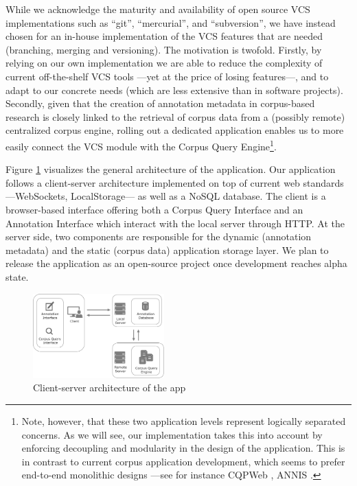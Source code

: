 \documentclass{sig-alternate}
\begin{document}
While we acknowledge the maturity and availability of open source VCS implementations such as
``git'', ``mercurial'', and ``subversion'', we have instead chosen for an in-house implementation
of the VCS features that are needed (branching, merging and versioning). The motivation is twofold.
Firstly, by relying on our own implementation we are able to reduce the complexity of
current off-the-shelf VCS tools ---yet at the price of losing features---,
and to adapt to our concrete needs (which are less extensive than in software projects).
Secondly, given that the creation of annotation metadata in corpus-based research
is closely linked to the retrieval of corpus data from a (possibly remote) centralized corpus engine,
rolling out a dedicated application enables us to more easily connect the VCS module with the Corpus
Query Engine\footnote{
  Note, however, that these two application levels represent logically separated concerns.
  As we will see, our implementation takes this into account by enforcing decoupling and modularity
  in the design of the application. This is in contrast to current corpus application development,
  which seems to prefer end-to-end monolithic designs ---see for instance
  CQPWeb \cite{Hardie2012}, ANNIS \cite{Zeldes2009}.
}.

Figure \ref{fig:app} visualizes the general architecture of the application.
Our application follows a client-server architecture implemented on top of current web
standards ---WebSockets, LocalStorage--- as well as a NoSQL database.
The client is a browser-based interface offering both a Corpus Query Interface and an Annotation
Interface which interact with the local server through HTTP.
At the server side, two components are responsible for the dynamic (annotation
metadata) and the static (corpus data) application storage layer. We plan to release the
application as an open-source project once development reaches alpha state.

\begin{figure}
  \centering
  \includegraphics[width=0.45\textwidth]{./img/app-remote.pdf}
  \caption{\label{fig:app}Client-server architecture of the app}
\end{figure}
\end{document}
